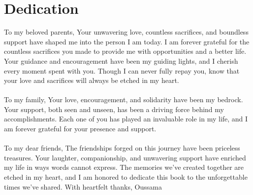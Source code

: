 \chapter*{Dedication}

To my beloved parents, Your unwavering love, countless sacrifices, and boundless support have shaped me into the person I am today. I am forever grateful for the countless sacrifices you made to provide me with opportunities and a better life. Your guidance and encouragement have
been my guiding lights, and I cherish every moment spent with you. Though I can never
fully repay you, know that your love and sacrifices will always be etched in my heart.
\\
\\
To my family,
Your love, encouragement, and solidarity have been my bedrock. Your support,
both seen and unseen, has been a driving force behind my accomplishments. Each one of
you has played an invaluable role in my life, and I am forever grateful for your presence
and support.
\\
\\
To my dear friends,
The friendships forged on this journey have been priceless treasures. Your laughter, companionship, and unwavering support have enriched my life in ways words cannot
express. The memories we’ve created together are etched in my heart, and I am honored
to dedicate this book to the unforgettable times we’ve shared.
With heartfelt thanks,
Oussama